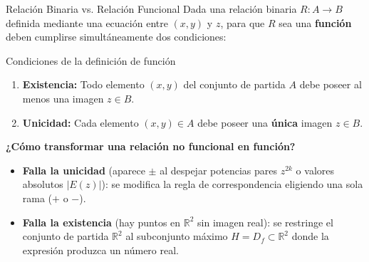 \documentclass[aspectratio=169, 10pt]{beamer}
\begin{document}
\begin{frame}{Relación Binaria vs. Relación Funcional}
  Dada una relación binaria $R : A \longrightarrow B$ definida mediante una ecuación entre $(x,y)$ y $z$, para que $R$ sea una \textbf{función} deben cumplirse simultáneamente dos condiciones:

  \vspace{0.2cm}
  \begin{block}{Condiciones de la definición de función}
    \begin{enumerate}
      \item \textbf{Existencia:} Todo elemento $(x,y)$ del conjunto de partida $A$ debe poseer al menos una imagen $z \in B$.
      \item \textbf{Unicidad:} Cada elemento $(x,y) \in A$ debe poseer una \textbf{única} imagen $z \in B$.
    \end{enumerate}
  \end{block}

  \vspace{0.2cm}
  \textbf{¿Cómo transformar una relación no funcional en función?}
  \begin{itemize}
    \item \textbf{Falla la unicidad} (aparece $\pm$ al despejar potencias pares $z^{2k}$ o valores absolutos $|E(z)|$): se modifica la regla de correspondencia eligiendo una sola rama ($+$ o $-$).
    \item \textbf{Falla la existencia} (hay puntos en $\mathbb{R}^2$ sin imagen real): se restringe el conjunto de partida $\mathbb{R}^2$ al subconjunto máximo $H = D_f \subset \mathbb{R}^2$ donde la expresión produzca un número real.
  \end{itemize}
\end{frame}
\end{document}
